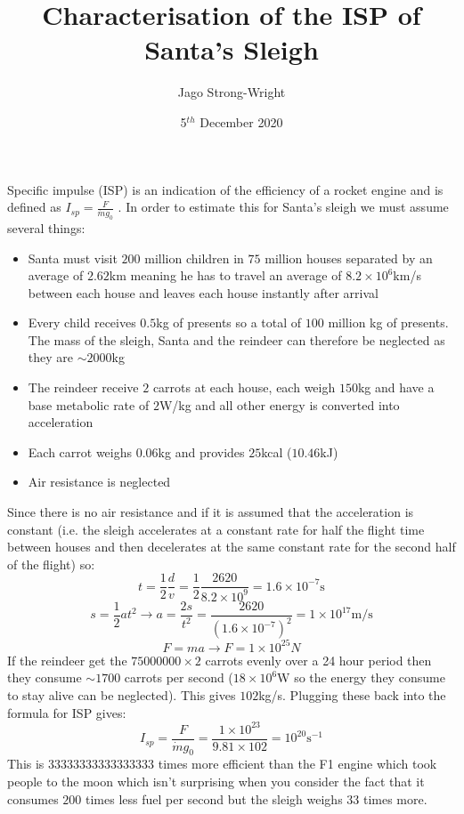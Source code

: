 \documentclass[letterpaper,11pt]{article}
\begin{document}
\title{Characterisation of the ISP of Santa's Sleigh}
\author{Jago Strong-Wright}
\date{5$^{th}$ December 2020}
\maketitle

Specific impulse (ISP) is an indication of the efficiency of a rocket engine and is defined as $I_{sp}=\frac{F}{\dot m g_0}$ \cite{nasa}. In order to estimate this for Santa's sleigh we must assume several things:
\begin{itemize}
    \item Santa must visit $200$ million children in $75$ million houses separated by an average of $2.62$km meaning he has to travel an average of $8.2\times10^{6}$km/s between each house and leaves each house instantly after arrival\cite{speed}
    \item Every child receives $0.5$kg of presents so a total of $100$ million kg of presents. The mass of the sleigh, Santa and the reindeer can therefore be neglected as they are $\sim2000$kg
    \item The reindeer receive $2$ carrots at each house, each weigh $150$kg and have a base metabolic rate of $2$W/kg\cite{deer_bmr} and all other energy is converted into acceleration
    \item Each carrot weighs $0.06$kg and provides $25$kcal ($10.46$kJ)
    \item Air resistance is neglected
\end{itemize}
Since there is no air resistance and if it is assumed that the acceleration is constant (i.e. the sleigh accelerates at a constant rate for half the flight time between houses and then decelerates at the same constant rate for the second half of the flight) so:
$$t=\frac{1}{2}\frac{d}{v}=\frac{1}{2}\frac{2620}{8.2\times10^{9}}=1.6\times10^{-7}\text{s}$$
$$s=\frac{1}{2}at^2\rightarrow a=\frac{2s}{t^2}=\frac{2620}{(1.6\times10^{-7})^2}=1\times10^{17}\text{m/s}$$
$$F=ma\rightarrow F=1\times10^{25}N$$
If the reindeer get the $75000000\times2$ carrots evenly over a 24 hour period then they consume $\sim1700$ carrots per second ($18\times10^6$W so the energy they consume to stay alive can be neglected). This gives $102$kg/s. Plugging these back into the formula for ISP gives:
$$I_{sp}=\frac{F}{\dot m g_0}=\frac{1\times10^{23}}{9.81\times 102}=10^{20}\text{s}^{-1}$$
This is $33333333333333333$ times more efficient than the F1 engine which took people to the moon which isn't surprising when you consider the fact that it consumes $200$ times less fuel per second but the sleigh weighs 33 times more.
\printbibliography
\end{document}
